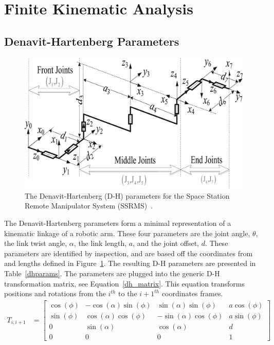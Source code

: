 \documentclass{article}
\begin{document}
\section{Finite Kinematic Analysis}
\subsection{Denavit-Hartenberg Parameters}
\begin{figure}[b!]
\includegraphics[width=\textwidth]{dh.jpg}
\caption{The Denavit-Hartenberg (D-H) parameters for the Space Station Remote Manipulator System (SSRMS)~\cite{xu2014analytical}.}
\label{dh_params}
\end{figure}

The Denavit-Hartenberg parameters form a minimal representation of a kinematic linkage of a robotic arm.
These four parameters are the joint angle, $\theta$, the link twist angle, $\alpha$, the link length, $a$, and the joint offset, $d$.
These parameters are identified by inspection, and are based off the coordinates from and lengths defined in Figure~\ref{dh_params}.
The resulting D-H parameters are presented in Table~\ref{dhparams}.
The parameters are plugged into the generic D-H transformation matrix, see Equation~\ref{dh_matrix}.
This equation transforms positions and rotations from the $i^{th}$ to the $i+1^{th}$ coordinates frames.
\begin{align}
T_{i, i+1} &=
\left[\begin{matrix}
\cos{\left (\phi \right )} & - \cos{\left (\alpha \right )} \sin{\left (\phi \right )} &   \sin{\left (\alpha \right )} \sin{\left (\phi \right )} & a \cos{\left (\phi \right )}\\
\sin{\left (\phi \right )} &   \cos{\left (\alpha \right )} \cos{\left (\phi \right )} & - \sin{\left (\alpha \right )} \cos{\left (\phi \right )} & a \sin{\left (\phi \right )}\\
                         0 &   \sin{\left (\alpha \right )}                            &   \cos{\left (\alpha \right )} & d\\
0 & 0 & 0 & 1
\end{matrix}\right]
\label{dh_matrix}
\end{align}
\end{document}
